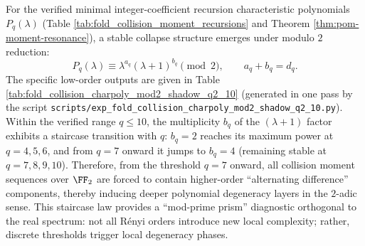 


\begin{remark}\label{rem:pom-charpoly-mod2-staircase-q2-10}
For the verified minimal integer-coefficient recursion characteristic polynomials \(P_q(\lambda)\) (Table \ref{tab:fold_collision_moment_recursions} and Theorem \ref{thm:pom-moment-resonance}), a stable collapse structure emerges under modulo \(2\) reduction:
\[
P_q(\lambda)\equiv \lambda^{a_q}(\lambda+1)^{b_q}\pmod 2,
\qquad a_q+b_q=d_q.
\]
The specific low-order outputs are given in Table \ref{tab:fold_collision_charpoly_mod2_shadow_q2_10} (generated in one pass by the script \texttt{scripts/exp\_fold\_collision\_charpoly\_mod2\_shadow\_q2\_10.py}).
Within the verified range \(q\le 10\), the multiplicity \(b_q\) of the \((\lambda+1)\) factor exhibits a staircase transition with \(q\): \(b_q=2\) reaches its maximum power at \(q=4,5,6\), and from \(q=7\) onward it jumps to \(b_q=4\) (remaining stable at \(q=7,8,9,10\)).
Therefore, from the threshold \(q=7\) onward, all collision moment sequences over \(\FF_2\) are forced to contain higher-order ``alternating difference'' components, thereby inducing deeper polynomial degeneracy layers in the \(2\)-adic sense.
This staircase law provides a ``mod-prime prism'' diagnostic orthogonal to the real spectrum: not all Rényi orders introduce new local complexity; rather, discrete thresholds trigger local degeneracy phases.
\end{remark}



